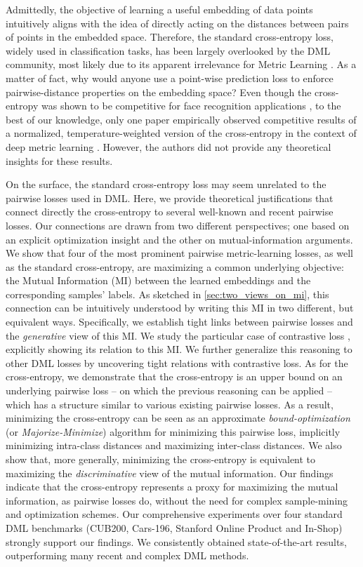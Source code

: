 \documentclass[runningheads]{llncs}
\begin{document}
Admittedly, the objective of learning a useful embedding of data points intuitively aligns with the idea of directly acting on the distances between pairs of points in the embedded space. Therefore, the standard cross-entropy loss, widely used in classification tasks, has been largely overlooked by the DML community, most likely due to its apparent irrelevance for Metric Learning \cite{center_loss}. As a matter of fact, why would anyone use a point-wise prediction loss to enforce pairwise-distance properties on the embedding space? Even though the cross-entropy was shown to be competitive for face recognition applications \cite{deephypersphere, wang2018cosface, wang2018additivesoftmax}, to the best of our knowledge, only one paper empirically observed competitive results of a normalized, temperature-weighted version of the cross-entropy in the context of deep metric learning \cite{zhai2018classification}. However, the authors did not provide any theoretical insights for these results. 


On the surface, the standard cross-entropy loss may seem unrelated to the pairwise losses used in DML. Here, we provide theoretical justifications that connect directly the cross-entropy to several well-known and recent pairwise losses. Our connections are drawn from two different perspectives; one based on an explicit optimization insight and the other on mutual-information arguments. We show that four of the most prominent pairwise metric-learning losses, as well as the standard cross-entropy, are maximizing a common underlying objective: the Mutual Information (MI) between the learned embeddings and the corresponding samples' labels. As sketched in \autoref{sec:two_views_on_mi}, this connection can be intuitively understood by writing this MI in two different, but equivalent ways. Specifically, we establish tight links between pairwise losses and the \textit{generative} view of this MI. We study the particular case of contrastive loss \cite{hadsell2006dimensionality}, explicitly showing its relation to this MI. We further generalize this reasoning to other DML losses by uncovering tight relations with contrastive loss.
As for the cross-entropy, we demonstrate that the cross-entropy is an upper bound on an underlying pairwise loss -- on which the previous reasoning can be applied -- which has a structure similar to various existing pairwise losses. As a result, minimizing the cross-entropy can be seen as an approximate \emph{bound-optimization} (or \emph{Majorize-Minimize}) algorithm for minimizing this pairwise loss, implicitly minimizing intra-class distances and maximizing inter-class distances.  We also show that, more generally, minimizing the cross-entropy is equivalent to maximizing the \textit{discriminative} view of the mutual information. Our findings indicate that the cross-entropy represents a proxy for maximizing the mutual information, as pairwise losses do, without the need for complex sample-mining and optimization schemes. Our comprehensive experiments over four standard DML benchmarks (CUB200, Cars-196, Stanford Online Product and In-Shop) strongly support our findings. We consistently obtained state-of-the-art results, outperforming many recent and complex DML methods.
\end{document}
